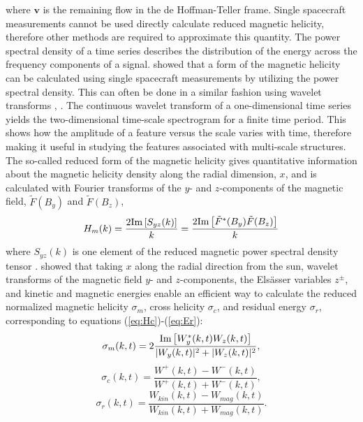 where $\mathbf{v}$ is the remaining flow in the de Hoffman-Teller frame. Single spacecraft measurements cannot be used directly calculate reduced magnetic helicity, therefore other methods are required to approximate this quantity. The power spectral density of a time series describes the distribution of the energy across the frequency components of a signal. \cite{Matthaeus:1982} showed that a form of the magnetic helicity can be calculated using single spacecraft measurements by utilizing the power spectral density. This can often be done in a similar fashion using wavelet transforms \cite{Telloni:2012}, \cite{Telloni:2013}. The continuous wavelet transform of a one-dimensional time series yields the two-dimensional time-scale spectrogram for a finite time period. This shows how the amplitude of a feature versus the scale varies with time, therefore making it useful in studying the features associated with multi-scale structures. The so-called reduced form of the magnetic helicity gives quantitative information about the magnetic helicity density along the radial dimension, $x$, and is calculated with Fourier transforms of the $y$- and $z$-components of the magnetic field, $\tilde{F}(B_y)$ and $\tilde{F}(B_z)$,
\begin{equation}
    H_m(k) = \frac{2 \textnormal{Im}\left[ S_{yz} (k) \right]}{k} = \frac{2 \textnormal{Im}\left[ \tilde{F}^*(B_y)\tilde{F}(B_z) \right]}{k}
\end{equation}
where $S_{yz}(k)$ is one element of the reduced magnetic power spectral density tensor \cite{Matthaeus:1982}. \cite{Telloni:2012} showed that taking $x$ along the radial direction from the sun, wavelet transforms of the magnetic field $y$- and $z$-components, the Els\"asser variables $z^\pm$, and kinetic and magnetic energies enable an efficient way to calculate the reduced normalized magnetic helicity $\sigma_m$, cross helicity $\sigma_c$, and residual energy $\sigma_r$, corresponding to equations (\ref{eq:Hc})-(\ref{eq:Er}):
\begin{equation}
    \sigma_m(k,t) = 2\frac{\textnormal{Im}\left[ W_y^*(k,t)W_z(k,t) \right]}{|W_y(k,t)|^2 + |W_z(k,t)|^2} ,
    \label{eq:sigm}
\end{equation}
\begin{equation}
        \sigma_c(k,t) = \frac{W^+(k,t)-W^-(k,t)}{W^+(k,t)+W^-(k,t)} ,
        \label{eq:sigc}
\end{equation}
 \begin{equation}
    \sigma_r(k,t) = \frac{W_{kin}(k,t) - W_{mag}(k,t)}{W_{kin}(k,t) + W_{mag}(k,t)} .
    \label{eq:sigr}
\end{equation}

